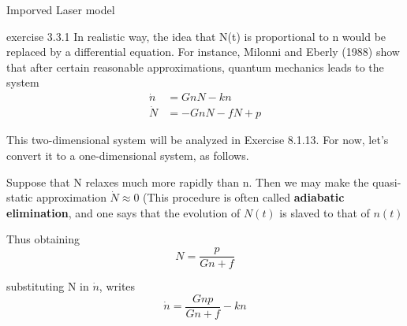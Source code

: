\documentclass[9pt,aspectratio=43,mathserif,table]{beamer}
\begin{document}
\begin{frame}{Imporved Laser model}

  \begin{multicols}{2}
exercise 3.3.1 
In realistic way, the idea that N(t) is proportional to n would be replaced by a differential equation. For instance, Milonni and Eberly (1988) show that after certain reasonable approximations, quantum mechanics leads to the system
    \begin{equation}
      \begin{aligned}
        \dot n &= GnN - k n \\
        \dot N &= -GnN - f N + p
      \end{aligned}
    \end{equation}

    This two-dimensional system will be analyzed in Exercise 8.1.13. For now, let's convert it to a one-dimensional system, as follows.

    Suppose that N relaxes much more rapidly than n. Then we may make the quasi-static approximation $\dot N \approx 0$ (This procedure is often called \textbf{adiabatic elimination}, and one says that the evolution of $N ( t )$ is slaved to that of $ n ( t )$

    Thus obtaining $$N = \frac{p}{Gn + f}$$

    substituting N in $\dot n$, writes
    $$\dot n  = \frac{ Gnp}{Gn + f}- kn$$
  \end{multicols}
\end{frame}
\end{document}
